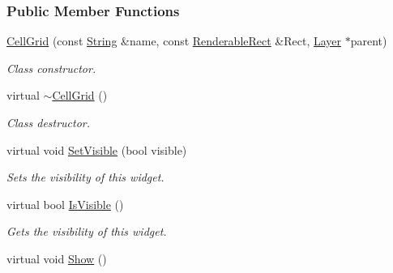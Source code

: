 \subsubsection*{Public Member Functions}
\begin{DoxyCompactItemize}
\item 
\hyperlink{classphys_1_1UI_1_1CellGrid_adabf84eb8411de0bcf9b57f648ca5810}{CellGrid} (const \hyperlink{namespacephys_aa03900411993de7fbfec4789bc1d392e}{String} \&name, const \hyperlink{structphys_1_1UI_1_1RenderableRect}{RenderableRect} \&Rect, \hyperlink{classphys_1_1UI_1_1Layer}{Layer} $\ast$parent)
\begin{DoxyCompactList}\small\item\em Class constructor. \item\end{DoxyCompactList}\item 
\hypertarget{classphys_1_1UI_1_1CellGrid_ac1abc38620bbb790afb01443cb2d6853}{
virtual \hyperlink{classphys_1_1UI_1_1CellGrid_ac1abc38620bbb790afb01443cb2d6853}{$\sim$CellGrid} ()}
\label{classphys_1_1UI_1_1CellGrid_ac1abc38620bbb790afb01443cb2d6853}

\begin{DoxyCompactList}\small\item\em Class destructor. \item\end{DoxyCompactList}\item 
virtual void \hyperlink{classphys_1_1UI_1_1CellGrid_abd1b3b422680a8b549c1c897b300da5d}{SetVisible} (bool visible)
\begin{DoxyCompactList}\small\item\em Sets the visibility of this widget. \item\end{DoxyCompactList}\item 
virtual bool \hyperlink{classphys_1_1UI_1_1CellGrid_af53601ab18e77237550c3eb97043e68c}{IsVisible} ()
\begin{DoxyCompactList}\small\item\em Gets the visibility of this widget. \item\end{DoxyCompactList}\item 
\hypertarget{classphys_1_1UI_1_1CellGrid_a772ea260724d009cfe6241e8dac5585b}{
virtual void \hyperlink{classphys_1_1UI_1_1CellGrid_a772ea260724d009cfe6241e8dac5585b}{Show} ()}
\label{classphys_1_1UI_1_1CellGrid_a772ea260724d009cfe6241e8dac5585b}


\end{DoxyCompactItemize}
